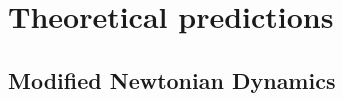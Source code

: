 \documentclass[usenatbib]{mnras}
\newcommand{\un}[1]{_{\rm #1}}
\newcommand{\dex}{\, {\rm dex}}
\begin{document}

\section{Theoretical predictions}
\label{sec:theories}

\subsection{Modified Newtonian Dynamics}
\label{sec:MOND}
\end{document}
